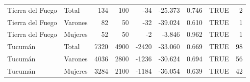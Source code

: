 \begin{table}
\begin{tabular}[t]{llrrrrrlr}
Tierra del Fuego & Total & 134 & 100 & -34 & -25.373 & 0.746 & TRUE & 2\\
Tierra del Fuego & Varones & 82 & 50 & -32 & -39.024 & 0.610 & TRUE & 1\\
Tierra del Fuego & Mujeres & 52 & 50 & -2 & -3.846 & 0.962 & TRUE & 1\\
Tucumán & Total & 7320 & 4900 & -2420 & -33.060 & 0.669 & TRUE & 98\\
\addlinespace
Tucumán & Varones & 4036 & 2800 & -1236 & -30.624 & 0.694 & TRUE & 56\\
Tucumán & Mujeres & 3284 & 2100 & -1184 & -36.054 & 0.639 & TRUE & 42\\
\bottomrule
\end{tabular}
\end{table}
